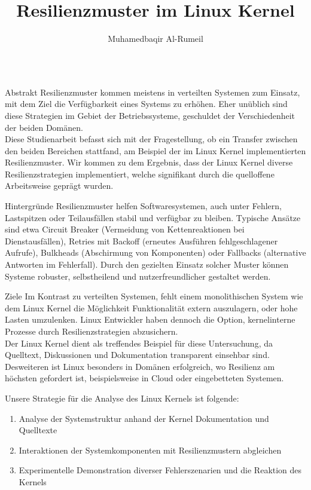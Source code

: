 \documentclass{beamer}
\title[ShortName]{Resilienzmuster im Linux Kernel}
\author{Muhamedbaqir Al-Rumeil}
\institute[Address]{
	Duale Hochschule Baden-Württemberg Heidenheim \\
	Marienstraße 20
	89518 Heidenheim
}
\begin{document}
\begin{frame}[t]
\begin{columns}[t]
	\begin{column2}
		\begin{block}{Abstrakt}
Resilienzmuster kommen meistens in verteilten Systemen zum Einsatz, mit dem Ziel die Verfügbarkeit eines Systems zu erhöhen. Eher unüblich sind diese Strategien im Gebiet der Betriebssysteme, geschuldet der Verschiedenheit der beiden Domänen. \\
Diese Studienarbeit befasst sich mit der Fragestellung, ob ein Transfer zwischen den beiden Bereichen stattfand, am Beispiel der im Linux Kernel implementierten Resilienzmuster. Wir kommen zu dem Ergebnis, dass der Linux Kernel diverse Resilienzstrategien implementiert, welche signifikant durch die quelloffene Arbeitsweise geprägt wurden. 



		\end{block}

		\begin{block}{Hintergründe}
Resilienz­muster helfen Software­systemen, auch unter Fehlern, Lastspitzen oder Teilausfällen stabil und verfügbar zu bleiben. 
Typische Ansätze sind etwa Circuit Breaker (Vermeidung von Kettenreaktionen bei Dienstausfällen), Retries mit Backoff (erneutes Ausführen fehlgeschlagener Aufrufe), Bulkheads (Abschirmung von Komponenten) oder Fallbacks (alternative Antworten im Fehlerfall). Durch den gezielten Einsatz solcher Muster können Systeme robuster, selbstheilend und nutzerfreundlicher gestaltet werden. 

		\end{block}

		\begin{block}{Ziele} 
Im Kontrast zu verteilten Systemen, fehlt einem monolithischen System wie dem Linux Kernel die Möglichkeit Funktionalität extern auszulagern, oder hohe Lasten umzulenken. Linux Entwickler haben dennoch die Option, kernelinterne Prozesse durch Resilienzstrategien abzusichern. \\
Der Linux Kernel dient als treffendes Beispiel für diese Untersuchung, da Quelltext, Diskussionen und Dokumentation transparent einsehbar sind. Desweiteren ist Linux besonders in Domänen erfolgreich, wo Resilienz am höchsten gefordert ist, beispielsweise in Cloud oder eingebetteten Systemen.

Unsere Strategie für die Analyse des Linux Kernels ist folgende:
\begin{enumerate}
\item Analyse der Systemstruktur anhand der Kernel Dokumentation und Quelltexte
\item Interaktionen der Systemkomponenten mit Resilienzmustern abgleichen
\item Experimentelle Demonstration diverser Fehlerszenarien und die Reaktion des Kernels
\end{enumerate}


\end{block}
\end{column2}
\end{columns}
\end{frame}
\end{document}
